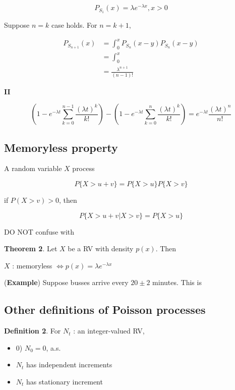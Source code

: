 \documentclass[12pt]{article}
\theoremstyle{nonumberbreak}
\begin{document}
$$
P_{S_1} (x) = \lambda e^{-\lambda x}, x>0
$$

Suppose $n=k$ case holds. For $n=k+1$, 

$$
\begin{aligned}
P_{S_{n+1}}(x) &= \int_0^x P_{S_n} ( x-y)  P_{S_n} ( x-y) \\[8pt]
&= \int_0^x \frac{}{} \\[8pt]
&= \frac{\lambda^{n+1}}{(n-1)!} 
\end{aligned}
$$




\textbf{II}

$$
(1 - e^{-\lambda t} \sum_{k=0}^{n-1} \frac{(\lambda t)^k}{k!}) - (1 - e^{-\lambda t} \sum_{k=0}^n \frac{(\lambda t)^k}{k!}) = e^{-\lambda t} \frac{(\lambda t)^n}{n!}
$$



\subsection{Memoryless property}


A random variable $X$ process 

$$
P \{ X > u + v \} = P \{ X > u  \} P \{ X > v \}
$$

if $P (X > v) > 0$, then

$$
P \{ X > u + v  | X > v\} = P\{ X > u\}
$$


DO NOT confuse with 


\begin{theorem}
\textbf{Theorem 2}. Let $X$ be a RV with density $p(x)$. Then

\begin{center}
$X$ : memoryless $\Leftrightarrow p(x) = \lambda e^{-\lambda x}$
\end{center}

\end{theorem}


(\textbf{Example}) Suppose busses arrive every $20 \pm 2$ minutes. This is \textbf{}







\subsection{Other definitions of Poisson processes}


\begin{theorem}
\textbf{Definition 2}. For $N_t$ : an integer-valued RV,

\begin{itemize}
	\item 0) $N_0 = 0$, a.s.
	\item $N_t$ has independent increments 
	\item $N_t$ has stationary increment 
\end{itemize}
\end{theorem}
\end{document}
